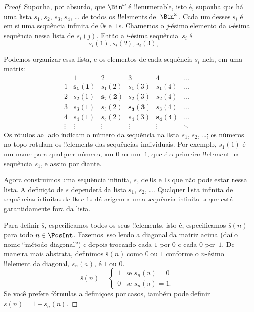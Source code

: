 \documentclass[../../../include/open-logic-section]{subfiles}
\begin{document}
\begin{proof}
Suponha, por absurdo, que $\Bin^\omega$ é
!!{enumerable}, isto é, suponha que há uma lista $s_{1}$, $s_{2}$,
$s_{3}$, $s_{4}$, \dots{} de todos os !!{element}s de~$\Bin^\omega$. Cada
um desses $s_i$ é em si uma sequência infinita de $0$s e~$1$s.
Chamemos o $j$-ésimo elemento da $i$-ésima sequência nessa lista de
$s_i(j)$. Então a $i$-ésima sequência~$s_i$ é
\[
s_i(1), s_i(2), s_i(3), \dots
\]

Podemos organizar essa lista, e os elementos de cada sequência $s_i$ nela,
em uma matriz:
\[
\begin{array}{c|c|c|c|c|c}
& 1 & 2 & 3 & 4 & \dots \\\hline
1 & \mathbf{s_{1}(1)} & s_{1}(2) & s_{1}(3) & s_1(4) & \dots \\\hline
2 & s_{2}(1)& \mathbf{s_{2}(2)} & s_2(3) & s_2(4) & \dots \\\hline
3 & s_{3}(1)& s_{3}(2) & \mathbf{s_3(3)} & s_3(4) & \dots \\\hline
4 & s_{4}(1)& s_{4}(2) & s_4(3) & \mathbf{s_4(4)} & \dots \\\hline
\vdots & \vdots & \vdots & \vdots & \vdots & \mathbf{\ddots}
\end{array}
\]
Os rótulos ao lado indicam o número da sequência na lista
$s_1$, $s_2$, \dots; os números no topo rotulam os !!{element}s
das sequências individuais. Por exemplo, $s_{1}(1)$ é um nome para
qualquer número, um $0$ ou um~$1$, que é o primeiro !!{element} na
sequência $s_{1}$, e assim por diante.

Agora construímos uma sequência infinita, $\overline{s}$, de $0$s e
$1$s que não pode estar nessa lista. A definição de
$\overline{s}$ dependerá da lista $s_1$, $s_2$, \dots. Qualquer
lista infinita de sequências infinitas de $0$s e $1$s dá origem a
uma sequência infinita~$\overline{s}$ que está garantidamente fora
da lista.

Para definir $\overline{s}$, especificamos todos os seus !!{element}s,
isto é, especificamos $\overline{s}(n)$ para todo $n \in \PosInt$. Fazemos isso
lendo a diagonal da matriz acima (daí o nome
``método diagonal'') e depois trocando cada $1$ por $0$ e cada
$0$ por~$1$. De maneira mais abstrata, definimos $\overline{s}(n)$ como $0$
ou $1$ conforme o $n$-ésimo !!{element} da diagonal,
$s_n(n)$, é $1$ ou $0$.
\[
\overline{s}(n) =
\begin{cases}
1 & \text{se $s_{n}(n) = 0$}\\
0 & \text{se $s_{n}(n) = 1$}.
\end{cases}
\]
Se você prefere fórmulas a definições por casos, também pode
definir $\overline{s}(n) = 1 - s_n(n)$.


\end{proof}
\end{document}
